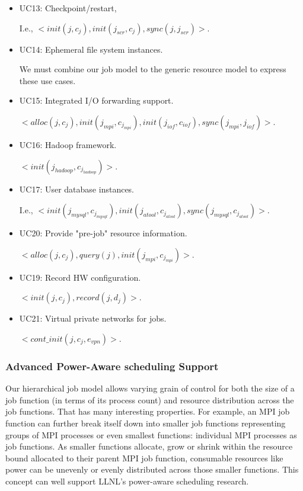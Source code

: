 \begin{itemize}
\item{UC13: Checkpoint/restart,

I.e., $<init(j, c_j), init(j_{scr}, c_j), sync(j, j_{scr})>$.}

\item{UC14: Ephemeral file system instances.

We must combine our job model to the generic resource model to express these use cases.}

\item{UC15: Integrated I/O forwarding support.

$<alloc(j, c_j), init(j_{mpi}, c_{j_{mpi}}), init(j_{iof}, c_{iof}), sync(j_{mpi}, j_{iof})>$.}

\item{UC16: Hadoop framework.

$<init(j_{hadoop}, c_{j_{hadoop}})>$.}

\item{UC17: User database instances.

I.e., $<init(j_{mysql}, c_{j_{mysql}}), init(j_{atool}, c_{j_{atool}}), sync(j_{mysql}, c_{j_{atool}})>$.}

\item{UC20: Provide "pre-job" resource information.

$<alloc(j, c_j), query(j), init(j_{mpi}, c_{j_{mpi}})>$.}

\item{UC19: Record HW configuration.

$<init(j, c_j), record(j, d_j)>$.}

\item{UC21: Virtual private networks for jobs.

$<cont\_init(j, c_j, e_{vpn})>$.}

\end{itemize}

\subsubsection{Advanced Power-Aware scheduling Support}
Our hierarchical job model allows varying grain of control for both the size of
a job function (in terms of its process count) and resource distribution
across the job functions.
That has many interesting properties. For example, an MPI
job function can further break itself down into smaller job functions
representing groups of MPI processes or even smallest functions:
individual MPI processes as job functions.
As smaller functions allocate, grow or shrink within the resource
bound allocated to their parent MPI job function, consumable resources
like power can be unevenly or evenly distributed across
those smaller functions.
This concept can well support LLNL's power-aware scheduling research.


